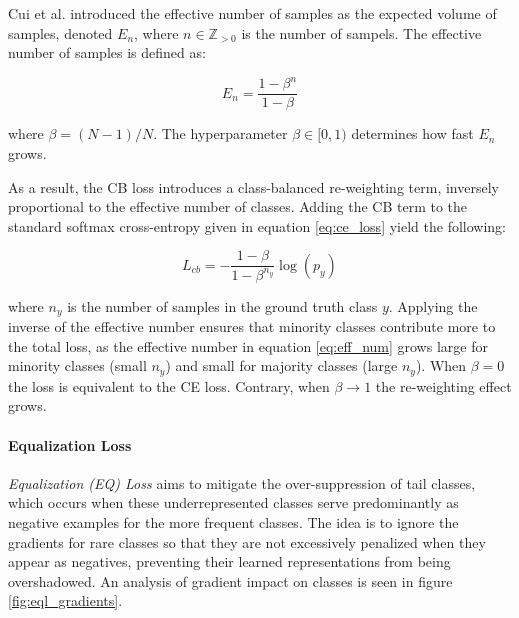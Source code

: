 Cui et al. \cite{cui2019classbalancedlossbasedeffective} introduced the effective number of samples as the expected volume of samples, denoted $E_n$, where $n \in \mathbb{Z}_{>0}$ is the number of sampels. The effective number of samples 
is defined as:

\begin{equation}
    \label{eq:eff_num}
    E_n = \frac{1-\beta^n}{1-\beta}
\end{equation}

where $\beta = (N-1)/N$. The hyperparameter $\beta \in [0,1)$ determines how fast $E_n$ grows.

As a result, the CB loss introduces a class-balanced re-weighting term, inversely proportional to the effective number of classes. Adding the CB term to the standard softmax cross-entropy given in equation \eqref{eq:ce_loss} yield the following:

\begin{equation}
    \label{eq:cb_loss}
    L_{cb} = - \frac{1 - \beta}{1 - \beta^{n_y}} \log(p_y)
\end{equation}

where $n_y$ is the number of samples in the ground truth class $y$. Applying the inverse of the effective number ensures that minority classes contribute more to the total loss, as the effective number in equation \eqref{eq:eff_num} grows large for minority classes (small $n_y$) and small for majority classes (large $n_y$). When $\beta = 0$ the loss is equivalent to the CE loss. Contrary, when $\beta \longrightarrow 1$ the re-weighting effect grows.




\paragraph{Equalization Loss}
\emph{Equalization (EQ) Loss} \cite{tan2020equalizationlosslongtailedobject} aims to mitigate the over-suppression of tail classes, which occurs when these underrepresented classes serve predominantly as negative examples for the more frequent classes. The idea is to ignore the gradients for rare classes so that they are not excessively penalized when they appear as negatives, preventing their learned representations from being overshadowed. An analysis of gradient impact on classes is seen in figure \ref{fig:eql_gradients}.

